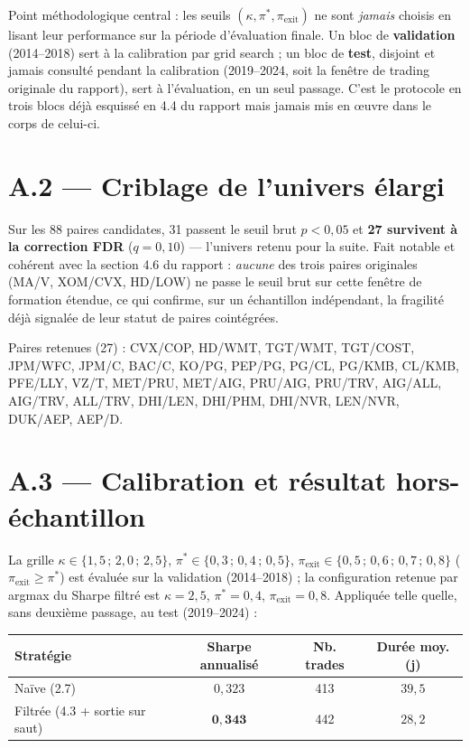 \documentclass{article}
\begin{document}
Point méthodologique central : les seuils $(\kappa, \pi^\ast, \pi_{\text{exit}})$ ne sont \emph{jamais} choisis en lisant leur performance sur la période d'évaluation finale. Un bloc de \textbf{validation} (2014--2018) sert à la calibration par grid search ; un bloc de \textbf{test}, disjoint et jamais consulté pendant la calibration (2019--2024, soit la fenêtre de trading originale du rapport), sert à l'évaluation, en un seul passage. C'est le protocole en trois blocs déjà esquissé en 4.4 du rapport mais jamais mis en \oe uvre dans le corps de celui-ci.

\section*{A.2 --- Criblage de l'univers élargi}
Sur les 88 paires candidates, 31 passent le seuil brut $p<0{,}05$ et \textbf{27 survivent à la correction FDR} ($q=0{,}10$) --- l'univers retenu pour la suite. Fait notable et cohérent avec la section 4.6 du rapport : \emph{aucune} des trois paires originales (MA/V, XOM/CVX, HD/LOW) ne passe le seuil brut sur cette fenêtre de formation étendue, ce qui confirme, sur un échantillon indépendant, la fragilité déjà signalée de leur statut de paires cointégrées.

Paires retenues (27) : CVX/COP, HD/WMT, TGT/WMT, TGT/COST, JPM/WFC, JPM/C, BAC/C, KO/PG, PEP/PG, PG/CL, PG/KMB, CL/KMB, PFE/LLY, VZ/T, MET/PRU, MET/AIG, PRU/AIG, PRU/TRV, AIG/ALL, AIG/TRV, ALL/TRV, DHI/LEN, DHI/PHM, DHI/NVR, LEN/NVR, DUK/AEP, AEP/D.

\section*{A.3 --- Calibration et résultat hors-échantillon}
La grille $\kappa \in \{1{,}5\,;\,2{,}0\,;\,2{,}5\}$, $\pi^\ast \in \{0{,}3\,;\,0{,}4\,;\,0{,}5\}$, $\pi_{\text{exit}} \in \{0{,}5\,;\,0{,}6\,;\,0{,}7\,;\,0{,}8\}$ ($\pi_{\text{exit}} \geq \pi^\ast$) est évaluée sur la validation (2014--2018) ; la configuration retenue par argmax du Sharpe filtré est $\kappa=2{,}5$, $\pi^\ast=0{,}4$, $\pi_{\text{exit}}=0{,}8$. Appliquée telle quelle, sans deuxième passage, au test (2019--2024) :

\begin{center}
\begin{tabular}{lccc}
\toprule
Stratégie & Sharpe annualisé & Nb. trades & Durée moy. (j) \\
\midrule
Naïve (2.7) & $0{,}323$ & 413 & $39{,}5$ \\
Filtrée (4.3 + sortie sur saut) & $\mathbf{0{,}343}$ & 442 & $28{,}2$ \\
\bottomrule
\end{tabular}
\end{center}
\end{document}

